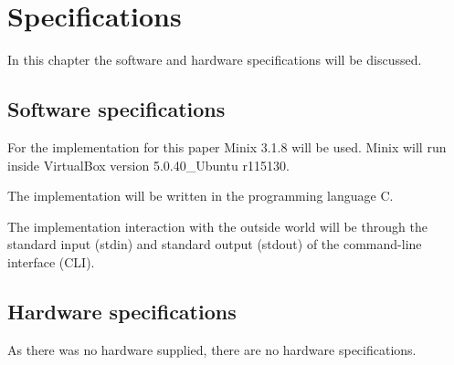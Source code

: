 \hypertarget{specifications}{%
\chapter{Specifications}\label{specifications}}

In this chapter the software and hardware specifications will be
discussed.

\hypertarget{software-specifications}{%
\section{Software specifications}\label{software-specifications}}

For the implementation for this paper Minix 3.1.8 will be used. Minix
will run inside VirtualBox version 5.0.40\_Ubuntu r115130.

The implementation will be written in the programming language C.

The implementation interaction with the outside world will be through
the standard input (stdin) and standard output (stdout) of the
command-line interface (CLI).

\hypertarget{hardware-specifications}{%
\section{Hardware specifications}\label{hardware-specifications}}

As there was no hardware supplied, there are no hardware specifications.
